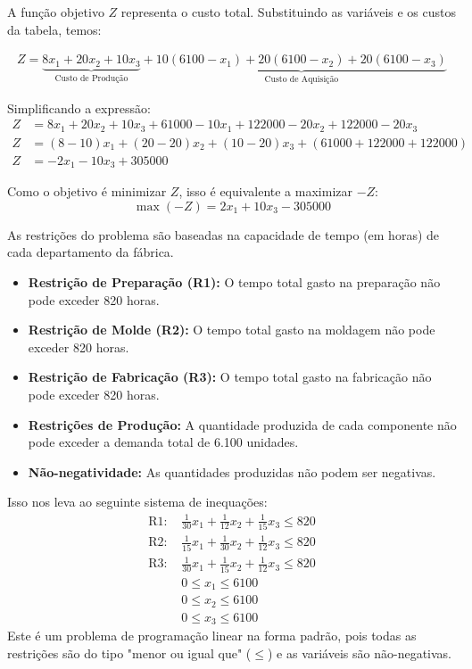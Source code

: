 \documentclass[12pt, a4paper]{article}
\begin{document}
A função objetivo $Z$ representa o custo total. Substituindo as variáveis e os custos da tabela, temos:

\begin{align*}
    Z = \underbrace{8x_1 + 20x_2 + 10x_3}_{\text{Custo de Produção}} + \underbrace{10(6100 - x_1) + 20(6100 - x_2) + 20(6100 - x_3)}_{\text{Custo de Aquisição}}
\end{align*}

Simplificando a expressão:
\begin{align*}
    Z &= 8x_1 + 20x_2 + 10x_3 + 61000 - 10x_1 + 122000 - 20x_2 + 122000 - 20x_3 \\
    Z &= (8 - 10)x_1 + (20 - 20)x_2 + (10 - 20)x_3 + (61000 + 122000 + 122000) \\
    Z &= -2x_1 - 10x_3 + 305000
\end{align*}

Como o objetivo é minimizar $Z$, isso é equivalente a maximizar $-Z$:
\begin{equation*}
    \max(-Z) = 2x_1 + 10x_3 - 305000
\end{equation*}

As restrições do problema são baseadas na capacidade de tempo (em horas) de cada departamento da fábrica.

\begin{itemize}
    \item \textbf{Restrição de Preparação (R1):} O tempo total gasto na preparação não pode exceder 820 horas.
    \item \textbf{Restrição de Molde (R2):} O tempo total gasto na moldagem não pode exceder 820 horas.
    \item \textbf{Restrição de Fabricação (R3):} O tempo total gasto na fabricação não pode exceder 820 horas.
    \item \textbf{Restrições de Produção:} A quantidade produzida de cada componente não pode exceder a demanda total de 6.100 unidades.
    \item \textbf{Não-negatividade:} As quantidades produzidas não podem ser negativas.
\end{itemize}

Isso nos leva ao seguinte sistema de inequações:
\begin{align*}
    \text{R1: } & \frac{1}{30}x_1 + \frac{1}{12}x_2 + \frac{1}{15}x_3 \le 820 \\
    \text{R2: } & \frac{1}{15}x_1 + \frac{1}{30}x_2 + \frac{1}{12}x_3 \le 820 \\
    \text{R3: } & \frac{1}{30}x_1 + \frac{1}{15}x_2 + \frac{1}{12}x_3 \le 820 \\
    & 0 \le x_1 \le 6100 \\
    & 0 \le x_2 \le 6100 \\
    & 0 \le x_3 \le 6100
\end{align*}
Este é um problema de programação linear na forma padrão, pois todas as restrições são do tipo "menor ou igual que" ($\le$) e as variáveis são não-negativas.
\end{document}
